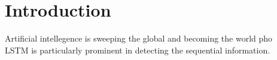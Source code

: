 \section{Introduction}
Artificial intellegence is sweeping the global and becoming the world pho
\\
LSTM is particularly prominent in detecting the sequential information. 